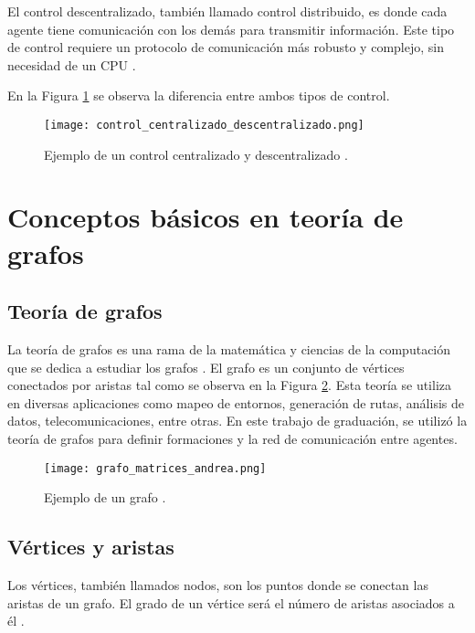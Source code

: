 El control descentralizado, también llamado control distribuido, es donde cada agente tiene comunicación con los demás para transmitir información. Este tipo de control requiere un protocolo de comunicación más robusto y complejo, sin necesidad de un CPU \cite{Control_centralizado_descentralizado}.

En la Figura \ref{fig:control_centralizado_descentralizado} se observa la diferencia entre ambos tipos de control.

\begin{figure}[H]
	\centering
	\texttt{[image: control\_centralizado\_descentralizado.png]}
	\caption{Ejemplo de un control centralizado y descentralizado \cite{Control_centralizado_descentralizado}.}
	\label{fig:control_centralizado_descentralizado}
\end{figure}


\section{Conceptos básicos en teoría de grafos}

\subsection{Teoría de grafos}
La teoría de grafos es una rama de la matemática y ciencias de la computación que se dedica a estudiar los grafos \cite{teoria_de_grafos}. El grafo es un conjunto de vértices conectados por aristas tal como se observa en la Figura \ref{fig:teoria_de_grafos}. Esta teoría se utiliza en diversas aplicaciones como mapeo de entornos, generación de rutas, análisis de datos, telecomunicaciones, entre otras. En este trabajo de graduación, se utilizó la teoría de grafos para definir formaciones y la red de comunicación entre agentes.

\begin{figure}[H]
	\centering
	\texttt{[image: grafo\_matrices\_andrea.png]}
	\caption{Ejemplo de un grafo \cite{PenaAM_2019_tesis}.}
	\label{fig:teoria_de_grafos}
\end{figure}

\subsection{Vértices y aristas}
Los vértices, también llamados nodos, son los puntos donde se conectan las aristas de un grafo. El grado de un vértice será el número de aristas asociados a él \cite{teoria_de_grafos}. 

